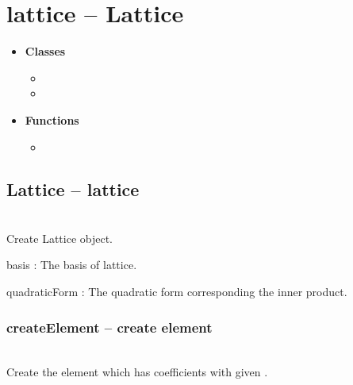 

 \section{lattice -- Lattice}
 \begin{itemize}
 \item {\bf Classes}
   \begin{itemize}
   \item {}
   \item {}
   \end{itemize}
 \item {\bf Functions}
   \begin{itemize}
   \item {}
   \end{itemize}
 \end{itemize}
%
  \subsection{Lattice -- lattice}
  \initialize
  \\
  \spacing
  \quad Create Lattice object. \\
  \spacing
  \spacing
  \begin{at}
    \item[basis]: The basis of  lattice.
    \item[quadraticForm]: The quadratic form corresponding the inner product.
  \end{at}
\C
  \method
  \subsubsection{createElement -- create element}
  \\
  \spacing
  \quad Create the element which has coefficients with given . \\
  \spacing
%
